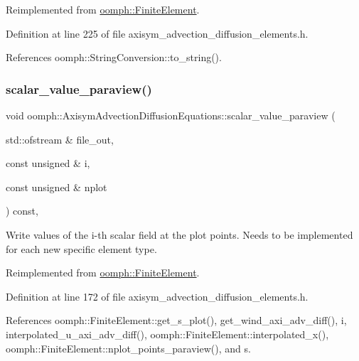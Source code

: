 Reimplemented from \hyperlink{classoomph_1_1FiniteElement_a49cc2d4f7ed5772bbc96f06760372b51}{oomph\+::\+Finite\+Element}.



Definition at line 225 of file axisym\+\_\+advection\+\_\+diffusion\+\_\+elements.\+h.



References oomph\+::\+String\+Conversion\+::to\+\_\+string().

\mbox{\label{classoomph_1_1AxisymAdvectionDiffusionEquations_aa39915ea1370a7785e8b046ab5660471}} 
\subsubsection{\texorpdfstring{scalar\+\_\+value\+\_\+paraview()}{scalar\_value\_paraview()}}
{\footnotesize\ttfamily void oomph\+::\+Axisym\+Advection\+Diffusion\+Equations\+::scalar\+\_\+value\+\_\+paraview (\begin{DoxyParamCaption}\item[{std\+::ofstream \&}]{file\+\_\+out,  }\item[{const unsigned \&}]{i,  }\item[{const unsigned \&}]{nplot }\end{DoxyParamCaption}) const\hspace{0.3cm}{\ttfamily [inline]}, {\ttfamily [virtual]}}



Write values of the i-\/th scalar field at the plot points. Needs to be implemented for each new specific element type. 



Reimplemented from \hyperlink{classoomph_1_1FiniteElement_a02cf8832a5e2886f1572bd36f7a7c1e3}{oomph\+::\+Finite\+Element}.



Definition at line 172 of file axisym\+\_\+advection\+\_\+diffusion\+\_\+elements.\+h.



References oomph\+::\+Finite\+Element\+::get\+\_\+s\+\_\+plot(), get\+\_\+wind\+\_\+axi\+\_\+adv\+\_\+diff(), i, interpolated\+\_\+u\+\_\+axi\+\_\+adv\+\_\+diff(), oomph\+::\+Finite\+Element\+::interpolated\+\_\+x(), oomph\+::\+Finite\+Element\+::nplot\+\_\+points\+\_\+paraview(), and s.

